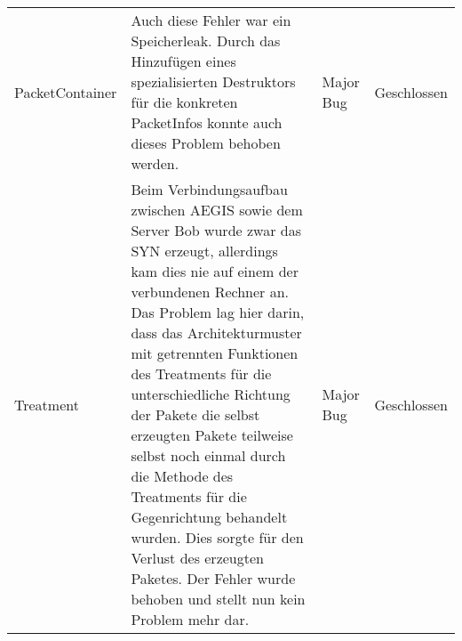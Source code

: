 \documentclass[../review_3.tex]{subfiles}
\begin{document}
\begin{longtable} [h] {p{3cm} p{6cm} p{2cm} l}
    PacketContainer &
    Auch diese Fehler war ein Speicherleak. Durch das Hinzufügen eines spezialisierten Destruktors für die konkreten PacketInfos konnte auch dieses Problem behoben werden. &
    Major Bug &
    Geschlossen \\
    
    Treatment &
    Beim Verbindungsaufbau zwischen AEGIS sowie dem Server Bob wurde zwar das SYN erzeugt, allerdings kam dies nie auf einem der verbundenen Rechner an. Das Problem lag hier darin, dass das Architekturmuster mit getrennten Funktionen des Treatments für die unterschiedliche Richtung der Pakete die selbst erzeugten Pakete teilweise selbst noch einmal durch die Methode des Treatments für die Gegenrichtung behandelt wurden. Dies sorgte für den Verlust des erzeugten Paketes. Der Fehler wurde behoben und stellt nun kein Problem mehr dar. &
    Major Bug &
    Geschlossen \\
    
    \bottomrule
    
\end{longtable}
\end{document}
